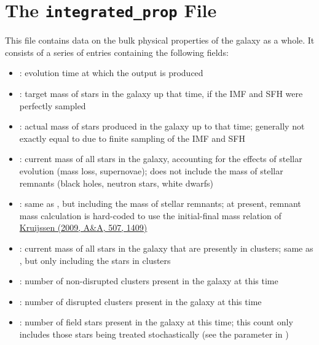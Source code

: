\documentclass[letterpaper,10pt,english]{sphinxmanual}
\begin{document}
\section{The \texttt{integrated\_prop} File}
\label{output:the-integrated-prop-file}
This file contains data on the bulk physical properties of the galaxy as a whole. It consists of a series of entries containing the following fields:
\begin{itemize}
\item {} 
: evolution time at which the output is produced

\item {} 
: target mass of stars in the galaxy up that time, if the IMF and SFH were perfectly sampled

\item {} 
: actual mass of stars produced in the galaxy up to that time; generally not exactly equal to  due to finite sampling of the IMF and SFH

\item {} 
:  current mass of all stars in the galaxy, accounting for the effects of stellar evolution (mass loss, supernovae); does not include the mass of stellar remnants (black holes, neutron stars, white dwarfs)

\item {} 
: same as , but including the mass of stellar remnants; at present, remnant mass calculation is hard-coded to use the initial-final mass relation of \href{http://adsabs.harvard.edu/abs/2009A\%26A...507.1409K}{Kruijssen (2009, A\&A, 507, 1409)}

\item {} 
: current mass of all stars in the galaxy that are presently in clusters; same as , but only including the stars in clusters

\item {} 
: number of non-disrupted clusters present in the galaxy at this time

\item {} 
: number of disrupted clusters present in the galaxy at this time

\item {} 
: number of field stars present in the galaxy at this time; this count only includes those stars being treated stochastically (see the parameter  in {\hyperref[parameters:ssec-stellar-keywords]{\emph{}}})

\end{itemize}
\end{document}
